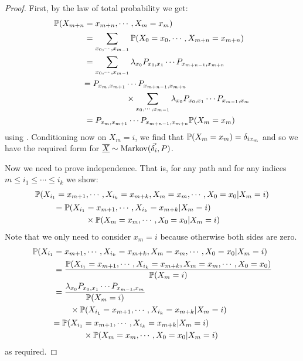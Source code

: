 \documentclass[../Main.tex]{subfiles}
\begin{document}
\begin{proof}
    First, by the law of total probability we get:
    \begin{align*}
        \P(X_{m+n} &= x_{m+n}, \cdots, X_m = x_m) \\
        &= \sum_{x_0, \cdots, x_{m-1}} \P(X_0 = x_0, \cdots, X_{m+n} = x_{m+n}) \\
        &= \sum_{x_0, \cdots, x_{m-1}} \lambda_{x_0}\Pmat{0}{1} \cdots \Pmat{m+n-1}{m+n} \\
        & \begin{aligned}=\Pmat{m}{m+1} &\cdots \Pmat{m+n-1}{m+n}\\&\times\sum_{x_0, \cdots, x_{m-1}} \lambda_{x_0}\Pmat{0}{1} \cdots \Pmat{m-1}{m}\end{aligned} \\
        &= \Pmat{m}{m+1} \cdots \Pmat{m+n-1}{m+n} \P(X_m = x_m)
    \end{align*}
    using . Conditioning now on $X_m = i$, we find that $\P(X_m = x_m) = \delta_{ix_m}$ and so we have the required form for $\chain{X} \sim \operatorname{Markov}(\vec{\delta_i}, P)$.

    Now we need to prove independence. That is, for any path and for any indices $m \leq i_1 \leq \cdots \leq i_k$ we show:
    \begin{align*}
        \P(X_{i_1} &= x_{m+1}, \cdots, X_{i_k} = x_{m + k}, X_m = x_m, \cdots, X_0 = x_0 | X_m = i) \\
        &\begin{aligned}=\P(X_{i_1} &= x_{m+1}, \cdots, X_{i_k} = x_{m + k} | X_m = i)\\
            &\times \P(X_m = x_m, \cdots, X_0 = x_0 | X_m = i)\end{aligned}
    \end{align*}
    Note that we only need to consider $x_m = i$ because otherwise both sides are zero.
    \begin{align*}
        \P(X_{i_1} &= x_{m+1}, \cdots, X_{i_k} = x_{m + k}, X_m = x_m, \cdots, X_0 = x_0 | X_m = i) \\
        &= \frac{\P(X_{i_1} = x_{m+1}, \cdots, X_{i_k} = x_{m + k}, X_m = x_m, \cdots, X_0 = x_0)}{\P(X_m = i)} \\
        &\begin{aligned}&= \frac{\lambda_{x_0} \Pmat{0}{1} \cdots \Pmat{m-1}{m}}{\P(X_m = i)}\\
            &\qquad\times\P(X_{i_1} = x_{m+1}, \cdots, X_{i_k} = x_{m+k} | X_m = i)\end{aligned} \\
        &\begin{aligned}=\P(X_{i_1} &= x_{m+1}, \cdots, X_{i_k} = x_{m + k} | X_m = i)\\
            &\times \P(X_m = x_m, \cdots, X_0 = x_0 | X_m = i)\end{aligned}
    \end{align*}
    as required.
\end{proof}
\end{document}
